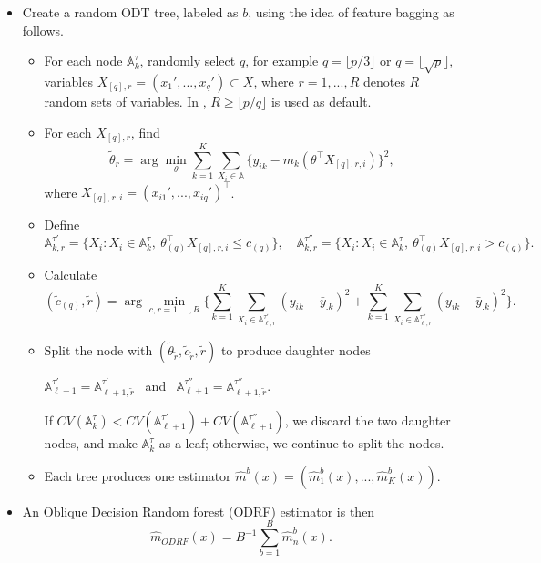 \begin{itemize}

	\item Create a random ODT tree, labeled as $ b$, using the idea of feature bagging as follows.

	\begin{itemize}

		\item For each node $\mathbb{A}_k^\tau$, randomly select $q$, for example $q = \lfloor p/3\rfloor $ or $ q = \lfloor\sqrt{p}\rfloor $, variables $  X_{[q], r} = (x_1', ..., x_q') \subset X $, where $ r = 1, ..., R $ denotes $R$ random sets of variables.   In , $R \ge \lfloor p/q\rfloor$ is used as default.

		\item For each $  X_{[q], r} $, find
		$$ \tilde \theta_{r} = \arg \min_{\theta} \sum_{k=1}^K \sum_{X_i \in \mathbb{A}} \Big\{y_{ik} - m_k(\theta^\top X_{[q],r, i})\Big\}^2,
		$$
		where $ X_{[q],r, i} = (x_{i1}', ..., x_{iq}')^\top $.
		\item Define
		$$
		\mathbb{A}_{k,r}^{\tau'} = \{ X_i: X_i \in \mathbb{A}_k^\tau, \  \theta_{(q)}^\top X_{[q],r, i} \le c_{(q)}\}, \quad
		\mathbb{A}_{k,r}^{\tau''} = \{ X_i: X_i \in \mathbb{A}_k^\tau, \ \theta_{(q)}^\top X_{[q],r, i} > c_{(q)}\}.
		$$
		\item  Calculate
		$$
		(\tilde c_{(q)}, \tilde r) = \arg \min_{c, r=1,..., R} \Big\{ \sum_{k=1}^K \sum_{X_i \in \mathbb{A}_{\ell,r}^{\tau'}} (y_{ik} - \bar y_{.k})^2  + \sum_{k=1}^K \sum_{X_i \in \mathbb{A}_{\ell, r}^{\tau''}} (y_{ik} - \bar y_{.k})^2\Big\}.
		$$
		\item Split the node with $ (\tilde \theta_{\tilde r}, \tilde c_{\tilde r}, \tilde r) $ to produce  daughter nodes
		\begin{center}
			$\mathbb{A}_{\ell+1}^{\tau'} = \mathbb{A}_{\ell+1,\tilde r}^{\tau'}$ \ and \  $\mathbb{A}_{\ell+1}^{\tau''} = \mathbb{A}_{\ell+1,\tilde r}^{\tau''}$.
		\end{center}
		If $ CV(\mathbb{A}_k^\tau) < CV(\mathbb{A}_{\ell+1}^{\tau'}) + CV(\mathbb{A}_{\ell+1}^{\tau''})$, we discard the two daughter nodes, and make $\mathbb{A}_k^\tau $ as a leaf; otherwise, we continue to split the nodes.

		\item Each tree produces one estimator $ \hat m^b (x) = (\hat m_{1}^b (x), ..., \hat m_{K}^b (x)) $.

	\end{itemize}
	\item  An Oblique Decision Random forest (ODRF) estimator is then 
	$$
	\hat m_{ODRF}(x) = B^{-1} \sum_{b=1}^B \hat m_{n}^b (x).
	$$
\end{itemize}

